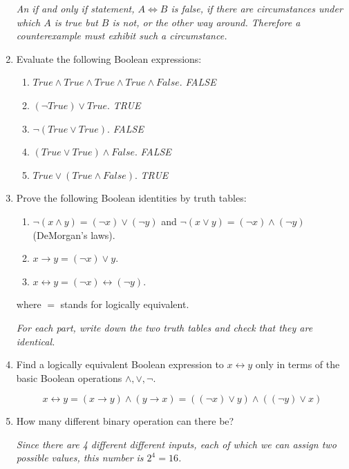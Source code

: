 \documentclass[11pt]{preprint}
\begin{document}
\begin{enumerate}
\vspace{0.1cm}
\textit{An if and only if statement, $A\Leftrightarrow B$ is false, if there are circumstances under which $A$ is true but $B$ is not, or the other way around. Therefore a counterexample must exhibit such a circumstance.}
\vspace{0.1cm}

\item Evaluate the following Boolean expressions:
\begin{enumerate}
\item $True\wedge True\wedge True\wedge True\wedge False$. \textit{FALSE}
\item $(\neg True)\vee True$. \textit{TRUE}
\item $\neg(True\vee True)$. \textit{FALSE}
\item $(True\vee True)\wedge False$. \textit{FALSE}
\item $True\vee(True\wedge False)$. \textit{TRUE}
\end{enumerate}
\item Prove the following Boolean identities by truth tables:
\begin{enumerate}
\item $\neg(x\wedge y)=(\neg x)\vee (\neg y)$ and $\neg(x\vee y)=(\neg x)\wedge(\neg y)$ (DeMorgan's laws).
\item $x\rightarrow y= (\neg x)\vee y$.
\item $x\leftrightarrow y = (\neg x)\leftrightarrow (\neg y)$.
\end{enumerate}
where $=$ stands for logically equivalent.

\vspace{0.1cm}
\textit{For each part, write down the two truth tables and check that they are identical.}
\vspace{0.1cm}

\item Find a logically equivalent Boolean expression to $x\leftrightarrow y$ only in terms of the basic Boolean operations $\wedge,\vee,\neg$.

\vspace{0.1cm}
\[
x\leftrightarrow y = (x\rightarrow y)\wedge (y\rightarrow x)=((\neg x)\vee y)\wedge ((\neg y)\vee x)
\]
\vspace{0.1cm}

\item How many different binary operation can there be? 

\vspace{0.1cm}
\textit{Since there are 4 different different inputs, each of which we can assign two possible values, this number is $2^4=16$.}
\vspace{0.1cm}


\end{enumerate}
\end{document}
